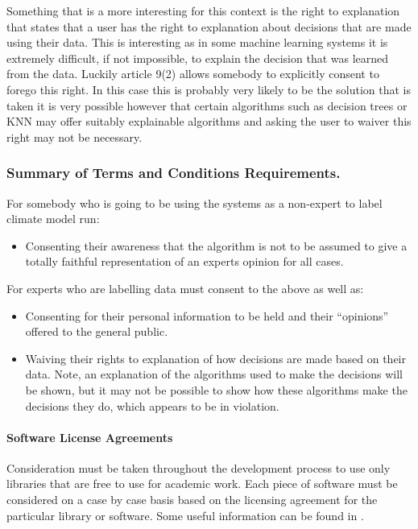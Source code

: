 \documentclass{ecmm427_assignment}
\begin{document}
\quad Something that is a more interesting for this context is the right
to explanation that states that a user has the right to explanation
about decisions that are made using their data. This is interesting
as in some machine learning systems it is extremely difficult, if
not impossible, to explain the decision that was learned from the
data. Luckily article 9(2) allows somebody to explicitly consent
to forego this right. In this case this is probably very likely to
be the solution that is taken it is very possible however that certain
algorithms such as decision trees or KNN may offer suitably explainable
algorithms and asking the user to waiver this right may not be necessary. 

\subsubsection{Summary of Terms and Conditions Requirements.}

For somebody who is going to be using the systems as a non-expert
to label climate model run:
\begin{itemize}
\item Consenting their awareness that the algorithm is not to be assumed
to give a totally faithful representation of an experts opinion for
all cases.
\end{itemize}
For experts who are labelling data must consent to the above as well
as:
\begin{itemize}
\item Consenting for their personal information to be held and their ``opinions''
offered to the general public.
\item Waiving their rights to explanation of how decisions are made based
on their data. Note, an explanation of the algorithms used to make
the decisions will be shown, but it may not be possible to show how
these algorithms make the decisions they do, which appears to be in
violation.
\end{itemize}

\paragraph{Software License Agreements}

\quad Consideration must be taken throughout the development process to use
only libraries that are free to use for academic work. Each piece of software must be considered on a case by case basis based on the licensing agreement for
the particular library or software. Some useful information can be found in \cite{ethicalandlegal}.
\end{document}
